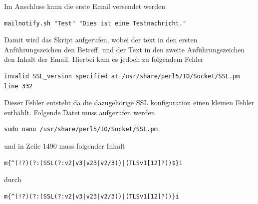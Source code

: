 \documentclass[11pt,a4paper]{article} %
\begin{document}
Im Anschluss kann die erste Email versendet werden
\begin{frame}

\begin{lstlisting}
mailnotify.sh "Test" "Dies ist eine Testnachricht."

\end{lstlisting}
\end{frame}
\newpage
Damit wird das Skript aufgerufen, wobei der text in den ersten Anführungszeichen den Betreff, und der Text in den zweite Anführungszeichen den Inhalt der Email.
Hierbei kam es jedoch zu folgendem Fehler
\begin{frame}

\begin{lstlisting}
invalid SSL_version specified at /usr/share/perl5/IO/Socket/SSL.pm line 332

\end{lstlisting}
\end{frame}

Dieser Fehler entsteht da die dazugehörige SSL konfiguration einen kleinen Fehler enthählt.
Folgende Datei muss aufgerufen werden
\begin{frame}

\begin{lstlisting}
sudo nano /usr/share/perl5/IO/Socket/SSL.pm

\end{lstlisting}
\end{frame}

und in Zeile 1490 muss folgender Inhalt
\begin{frame}

\begin{lstlisting}
m{^(!?)(?:(SSL(?:v2|v3|v23|v2/3))|(TLSv1[12]?))$}i

\end{lstlisting}
\end{frame}

durch
\begin{frame}

\begin{lstlisting}
m{^(!?)(?:(SSL(?:v2|v3|v23|v2/3))|(TLSv1[12]?))}i

\end{lstlisting}
\end{frame}
\end{document}
